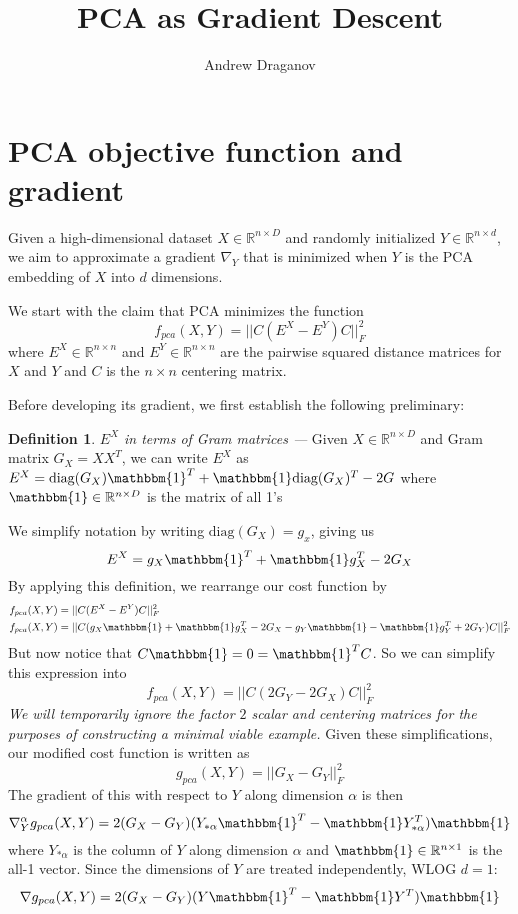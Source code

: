 \documentclass{article}
\title{PCA as Gradient Descent}
\author{Andrew Draganov}
\theoremstyle{definition}
\newtheorem{definition}{Definition}
\begin{document}
\maketitle
\section{PCA objective function and gradient}

Given a high-dimensional dataset $X \in \mathbb{R}^{n \times D}$ and randomly initialized $Y \in \mathbb{R}^{n \times d}$, we aim to approximate a gradient
$\nabla_Y$ that is minimized when $Y$ is the PCA embedding of $X$ into $d$ dimensions.

We start with the claim that PCA minimizes the function
\begin{equation}
    f_{pca}(X, Y) = ||C (E^X - E^Y) C ||^2_F
\end{equation}
where $E^X \in \mathbb{R}^{n \times n}$ and $E^Y \in \mathbb{R}^{n \times n}$ are the pairwise squared distance matrices for $X$ and $Y$ and $C$ is the $n \times
n$ centering matrix.

Before developing its gradient, we first establish the following preliminary:
\begin{definition}{\textit{$E^X$ in terms of Gram matrices ---}}
    Given $X \in \mathbb{R}^{n \times D}$ and Gram matrix $G_X = X X^T$, we can write $E^X$ as $E^X = \text{diag}(G_X) \mathbbm{1}^T + \mathbbm{1}
    \text{diag}(G_X)^T - 2G$ where $\mathbbm{1} \in \mathbb{R}^{n \times D}$ is the
    matrix of all 1's
\end{definition}

We simplify notation by writing $\text{diag}(G_X) = g_x$, giving us \[ E^X = g_X \mathbbm{1}^T + \mathbbm{1} g_X^T - 2G_X \]
By applying this definition, we rearrange our cost function by
\begin{align*}
    f_{pca}(X, Y) &= ||C(E^X - E^Y)C||_F^2 \\
    f_{pca}(X, Y) &= ||C(g_X \mathbbm{1} + \mathbbm{1} g_X^T - 2G_X - g_Y \mathbbm{1} - \mathbbm{1} g_Y^T + 2G_Y)C||_F^2 
\end{align*}
But now notice that $C \mathbbm{1} = 0 = \mathbbm{1}^T C$. So we can simplify this expression into
\[ f_{pca}(X, Y) = ||C(2G_Y - 2G_X)C||_F^2 \]
\textit{We will temporarily ignore the factor $2$ scalar and centering matrices for the purposes of constructing a minimal viable example.} Given these
simplifications, our modified cost function is written as
\[ g_{pca}(X, Y) = ||G_X - G_Y||_F^2 \]
The gradient of this with respect to $Y$ along dimension $\alpha$ is then
\[
\nabla^{\alpha}_Y g_{pca}(X, Y) = 2(G_X - G_Y)(Y_{*\alpha} \mathbbm{1}^T - \mathbbm{1} Y_{*\alpha}^T) \mathbbm{1}
\]
where $Y_{*\alpha}$ is the column of $Y$ along dimension $\alpha$ and $\mathbbm{1} \in \mathbb{R}^{n \times 1}$ is the all-1 vector. Since the dimensions of $Y$
are treated independently, WLOG $d=1$:
\begin{equation} \label{simple_gradient}
    \nabla g_{pca}(X, Y) = 2(G_X - G_Y)(Y \mathbbm{1}^T - \mathbbm{1} Y^T) \mathbbm{1}
\end{equation}
\end{document}
